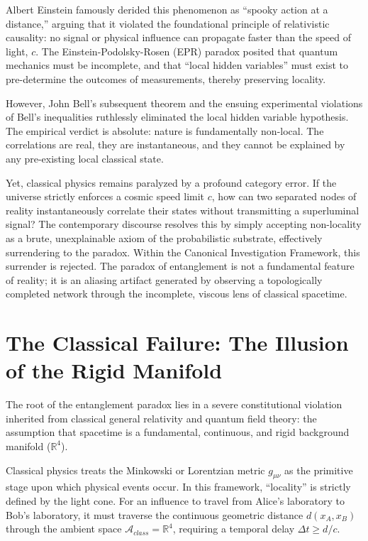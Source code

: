 \documentclass[12pt,twoside]{extbook}
\theoremstyle{definition}
\theoremstyle{remark}
\begin{document}
Albert Einstein famously derided this phenomenon as ``spooky action at a distance,'' arguing that it violated the foundational principle of relativistic causality: no signal or physical influence can propagate faster than the speed of light, $c$. The Einstein-Podolsky-Rosen (EPR) paradox posited that quantum mechanics must be incomplete, and that ``local hidden variables'' must exist to pre-determine the outcomes of measurements, thereby preserving locality.

However, John Bell's subsequent theorem and the ensuing experimental violations of Bell's inequalities ruthlessly eliminated the local hidden variable hypothesis. The empirical verdict is absolute: nature is fundamentally non-local. The correlations are real, they are instantaneous, and they cannot be explained by any pre-existing local classical state. 

Yet, classical physics remains paralyzed by a profound category error. If the universe strictly enforces a cosmic speed limit $c$, how can two separated nodes of reality instantaneously correlate their states without transmitting a superluminal signal? The contemporary discourse resolves this by simply accepting non-locality as a brute, unexplainable axiom of the probabilistic substrate, effectively surrendering to the paradox. Within the Canonical Investigation Framework, this surrender is rejected. The paradox of entanglement is not a fundamental feature of reality; it is an aliasing artifact generated by observing a topologically completed network through the incomplete, viscous lens of classical spacetime.

\section{The Classical Failure: The Illusion of the Rigid Manifold}
The root of the entanglement paradox lies in a severe constitutional violation inherited from classical general relativity and quantum field theory: the assumption that spacetime is a fundamental, continuous, and rigid background manifold ($\mathbb{R}^4$).

Classical physics treats the Minkowski or Lorentzian metric $g_{\mu\nu}$ as the primitive stage upon which physical events occur. In this framework, ``locality'' is strictly defined by the light cone. For an influence to travel from Alice's laboratory to Bob's laboratory, it must traverse the continuous geometric distance $d(x_A, x_B)$ through the ambient space $\mathcal{A}_{class} = \mathbb{R}^4$, requiring a temporal delay $\Delta t \geq d/c$. 
\end{document}
